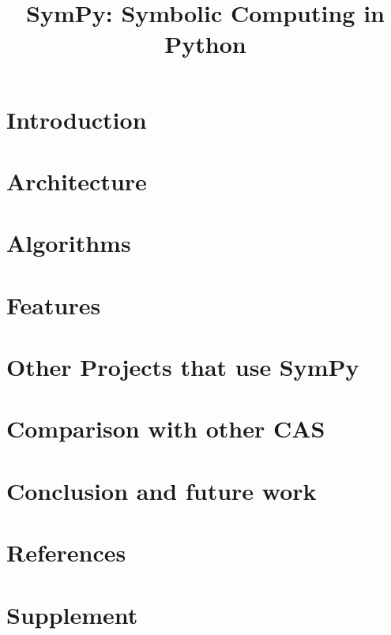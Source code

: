 \documentclass[review]{siamart0216}
\title{SymPy: Symbolic Computing in Python}
\begin{document}
\maketitle

\section{Introduction}




\section{Architecture}



\section{Algorithms}




\section{Features}






\section{Other Projects that use SymPy}



\section{Comparison with other CAS}



\section{Conclusion and future work}



\section{References}




\section{Supplement}


\end{document}
